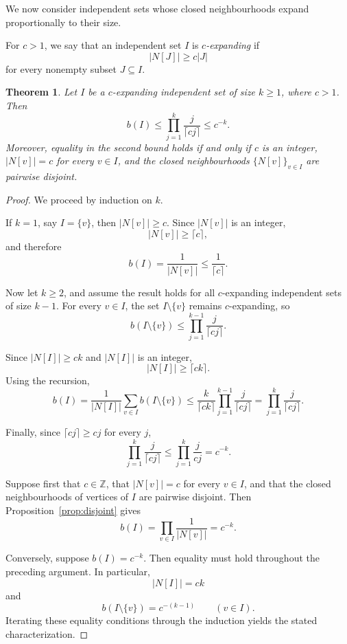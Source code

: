 \documentclass[11pt,a4paper]{article}
\numberwithin{equation}{section}
\theoremstyle{plain}
\newtheorem{theorem}{Theorem}[section]
\theoremstyle{definition}
\theoremstyle{remark}
\begin{document}
We now consider independent sets whose closed neighbourhoods expand proportionally to their size.

For \(c>1\), we say that an independent set \(I\) is \emph{\(c\)-expanding} if
\[
|N[J]|\ge c|J|
\]
for every nonempty subset \(J\subseteq I\).

\begin{theorem}
\label{thm:expansion}
Let \(I\) be a \(c\)-expanding independent set of size \(k\ge1\), where \(c>1\). Then
\[
b(I)
\le
\prod_{j=1}^{k}
\frac{j}{\lceil cj\rceil}
\le
c^{-k}.
\]
Moreover, equality in the second bound holds if and only if \(c\) is an integer, \(|N[v]|=c\) for every \(v\in I\), and the closed neighbourhoods \(\{N[v]\}_{v\in I}\) are pairwise disjoint.
\end{theorem}

\begin{proof}
We proceed by induction on \(k\).

If \(k=1\), say \(I=\{v\}\), then \(|N[v]|\ge c\). Since \(|N[v]|\) is an integer,
\[
|N[v]|\ge \lceil c\rceil,
\]
and therefore
\[
b(I)
=
\frac1{|N[v]|}
\le
\frac1{\lceil c\rceil}.
\]

Now let \(k\ge2\), and assume the result holds for all \(c\)-expanding independent sets of size \(k-1\). For every \(v\in I\), the set \(I\setminus\{v\}\) remains \(c\)-expanding, so
\[
b(I\setminus\{v\})
\le
\prod_{j=1}^{k-1}
\frac{j}{\lceil cj\rceil}.
\]

Since \(|N[I]|\ge ck\) and \(|N[I]|\) is an integer,
\[
|N[I]|
\ge
\lceil ck\rceil.
\]
Using the recursion,
\[
b(I)
=
\frac1{|N[I]|}
\sum_{v\in I}
b(I\setminus\{v\})
\le
\frac{k}{\lceil ck\rceil}
\prod_{j=1}^{k-1}
\frac{j}{\lceil cj\rceil}
=
\prod_{j=1}^{k}
\frac{j}{\lceil cj\rceil}.
\]

Finally, since \(\lceil cj\rceil\ge cj\) for every \(j\),
\[
\prod_{j=1}^{k}
\frac{j}{\lceil cj\rceil}
\le
\prod_{j=1}^{k}
\frac{j}{cj}
=
c^{-k}.
\]

Suppose first that \(c\in\mathbb Z\), that \(|N[v]|=c\) for every \(v\in I\), and that the closed neighbourhoods of vertices of \(I\) are pairwise disjoint. Then Proposition~\ref{prop:disjoint} gives
\[
b(I)
=
\prod_{v\in I}
\frac1{|N[v]|}
=
c^{-k}.
\]

Conversely, suppose \(b(I)=c^{-k}\). Then equality must hold throughout the preceding argument. In particular,
\[
|N[I]|=ck
\]
and
\[
b(I\setminus\{v\})
=
c^{-(k-1)}
\qquad
(v\in I).
\]
Iterating these equality conditions through the induction yields the stated characterization.
\end{proof}
\end{document}
